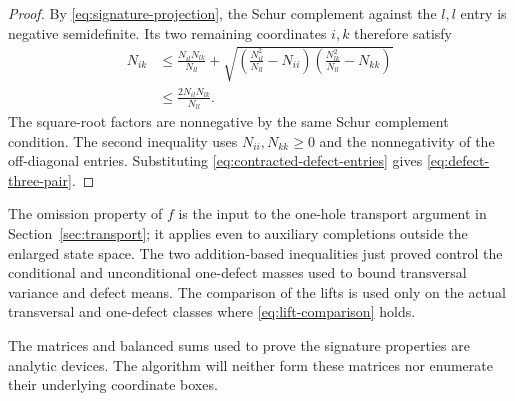 \begin{proof}
By \eqref{eq:signature-projection}, the Schur complement against
the \(l,l\) entry is negative semidefinite.
Its two remaining coordinates \(i,k\) therefore satisfy
\begin{align*}
 N_{ik}
 &\le \frac{N_{il}N_{lk}}{N_{ll}}
 +\sqrt{
   \left(\frac{N_{il}^2}{N_{ll}}-N_{ii}\right)
   \left(\frac{N_{lk}^2}{N_{ll}}-N_{kk}\right)}\\
 &\le \frac{2N_{il}N_{lk}}{N_{ll}}.
\end{align*}
The square-root factors are nonnegative by the same Schur
complement condition.
The second inequality uses \(N_{ii},N_{kk}\ge0\) and the
nonnegativity of the off-diagonal entries.
Substituting \eqref{eq:contracted-defect-entries} gives
\eqref{eq:defect-three-pair}.
\end{proof}

The omission property of $f$ is the input to the one-hole transport
argument in Section~\ref{sec:transport}; it applies even to auxiliary
completions outside the enlarged state space.  The two addition-based
inequalities just proved control the conditional and unconditional
one-defect masses used to bound transversal variance and defect means.
The comparison of the lifts is used only on the actual transversal
and one-defect classes where \eqref{eq:lift-comparison} holds.

The matrices and balanced sums used to prove the signature
properties are analytic devices.
The algorithm will neither form these matrices nor enumerate their
underlying coordinate boxes.
